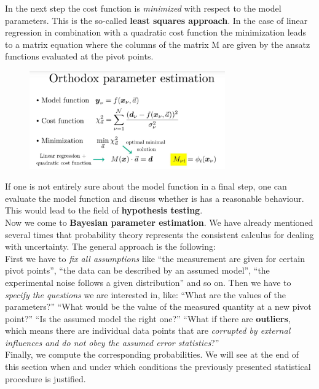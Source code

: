 \documentclass[12pt, a4paper]{scrartcl}
\begin{document}
In the next step the cost function is \textit{minimized} with respect to the model parameters. This 
is the so-called \textbf{least squares approach}. In the case of linear regression in combination 
with a quadratic cost function the
minimization leads to a matrix equation where the columns of the matrix M are given by the ansatz
functions evaluated at the pivot points.\\%
\begin{figure}[H]
	\centering
	\includegraphics[width=0.75\textwidth]{7_2.png}
\end{figure}

If one is not entirely sure about the model function in a final step, one can evaluate the model function and
discuss whether is has a reasonable behaviour. 
This would lead to the field of \textbf{hypothesis testing}.\\


Now we come to \textbf{Bayesian parameter estimation}.
We have already mentioned several times that probability theory represents the consistent
calculus for dealing with uncertainty. The general approach is the following:\\

First we have to \textit{fix all assumptions} like ``the measurement are given for certain pivot points'',
``the data can be described by an assumed model'', ``the experimental noise follows a given distribution'' 
and so on. Then we have to \textit{specify the questions} we are interested in, like: ``What 
are the values of the parameters?'' ``What would be the value of the measured quantity at a new pivot point?''
``Is the assumed model the right one?'' ``What if there are \textbf{outliers}, which means there are individual data points that are \textit{corrupted
by external influences and do not obey the assumed error statistics}?''\\

Finally, we compute the corresponding probabilities. 
We will see at the end of this section when and under which conditions the previously presented statistical procedure is justified. \\
\end{document}

